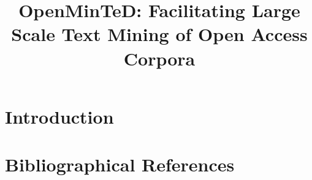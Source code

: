 \documentclass[10pt, a4paper]{article}
\title{OpenMinTeD: Facilitating Large Scale Text Mining of Open Access Corpora}
\begin{document}
\maketitleabstract

\section{Introduction}








\section{Bibliographical References}
\label{main:ref}





\end{document}

